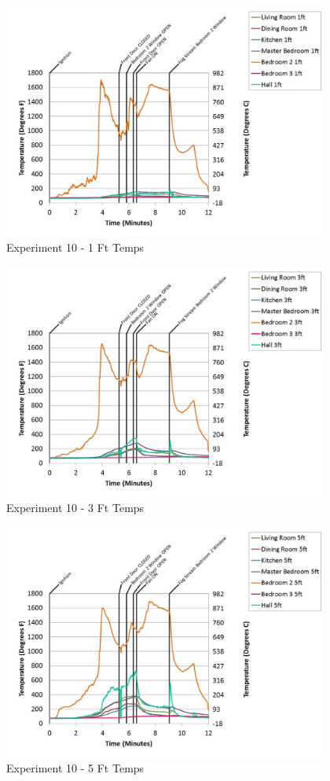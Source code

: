 \documentclass{article}
\begin{document}
\begin{appendices}
	\begin{figure}[h!]
		\centering
		\includegraphics[height=3.05in]{0_Images/Results_Charts/Exp_10_Charts/1FtTemps.pdf}
		\caption{Experiment 10 - 1 Ft Temps}
	\end{figure}
 

	\begin{figure}[h!]
		\centering
		\includegraphics[height=3.05in]{0_Images/Results_Charts/Exp_10_Charts/3FtTemps.pdf}
		\caption{Experiment 10 - 3 Ft Temps}
	\end{figure}
 
	\clearpage

	\begin{figure}[h!]
		\centering
		\includegraphics[height=3.05in]{0_Images/Results_Charts/Exp_10_Charts/5FtTemps.pdf}
		\caption{Experiment 10 - 5 Ft Temps}
	\end{figure}
 


\end{appendices}
\end{document}
